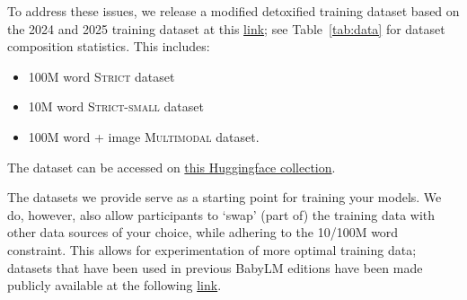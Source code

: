 \documentclass[11pt]{article}
\newcommand{\strict}[1]{\textsc{Strict}}
\newcommand{\strictsmall}[1]{\textsc{Strict-small}}
\newcommand{\vision}[1]{\textsc{Multimodal}}
\begin{document}
To address these issues, we release a modified detoxified training dataset based on the 2024 and 2025 training dataset \citep{choshen2024call} at this \href{https://osf.io/ad7qg/}{link}; see Table~\ref{tab:data} for dataset composition statistics.
This includes:
\begin{itemize}[noitemsep]
    \item 100M word \strict{} dataset
    \item 10M word \strictsmall{} dataset
    \item 100M word + image \vision{} dataset.

\end{itemize}

\noindent The dataset can be accessed on \href{https://huggingface.co/collections/BabyLM-community/babylm-2026}{this Huggingface collection}.


The datasets we provide serve as a starting point for training your models.
We do, however, also allow participants to `swap' (part of) the training data with other data sources of your choice, while adhering to the 10/100M word constraint.
This allows for experimentation of more optimal training data; datasets that have been used in previous BabyLM editions have been made publicly available at the following \href{https://docs.google.com/spreadsheets/d/1R4spgWHdSkYDZceaXHOdj0c-wMTSrn7ny7kC1lOf0ko/edit?usp=sharing}{link}.



\end{document}
